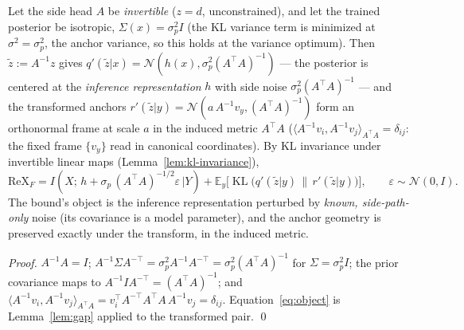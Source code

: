 \begin{proposition}\label{prop:inverse}
Let the side head $A$ be \emph{invertible} ($z = d$, unconstrained), and let the trained
posterior be isotropic, $\Sigma(x) = \sigma_p^2 I$ (the KL variance term is minimized at
$\sigma^2 = \sigma_p^2$, the anchor variance, so this holds at the variance optimum).
Then $\tilde z := A^{-1} z$ gives
$q'(\tilde z|x) = \mathcal{N}(h(x), \sigma_p^2 (A^{\top}A)^{-1})$ --- the posterior is
centered at the \emph{inference representation} $h$ with side noise
$\sigma_p^2 (A^{\top}A)^{-1}$ --- and the transformed anchors
$r'(\tilde z|y) = \mathcal{N}(a\, A^{-1} v_y, (A^{\top}A)^{-1})$ form an orthonormal
frame at scale $a$ in the induced metric $A^{\top}A$
($\langle A^{-1}v_i, A^{-1}v_j\rangle_{A^{\top}A} = \delta_{ij}$: the fixed frame
$\{v_y\}$ read in canonical coordinates). By KL invariance under invertible linear maps
(Lemma~\ref{lem:kl-invariance}),
\begin{equation}
\mathrm{ReX}_F
= I(X;\, h + \sigma_p\,(A^{\top}A)^{-1/2}\varepsilon\,|Y)
+ \mathbb{E}_y\big[\operatorname{KL}\big(q'(\tilde z|y)\,\|\,r'(\tilde z|y)\big)\big],
\qquad \varepsilon \sim \mathcal{N}(0, I) .
\label{eq:object}
\end{equation}
The bound's object is the inference representation perturbed by \emph{known,
side-path-only} noise (its covariance is a model parameter), and the anchor geometry is
preserved exactly under the transform, in the induced metric.
\end{proposition}

\begin{proof}
$A^{-1}A = I$; $A^{-1}\Sigma A^{-\top} = \sigma_p^2 A^{-1}A^{-\top}
= \sigma_p^2 (A^{\top}A)^{-1}$ for $\Sigma = \sigma_p^2 I$; the prior covariance maps to
$A^{-1} I A^{-\top} = (A^{\top}A)^{-1}$; and
$\langle A^{-1}v_i, A^{-1}v_j\rangle_{A^{\top}A}
= v_i^{\top} A^{-\top} A^{\top} A\, A^{-1} v_j = \delta_{ij}$.
Equation~\eqref{eq:object} is Lemma~\ref{lem:gap} applied to the transformed pair.
\hfill\qed
\end{proof}

